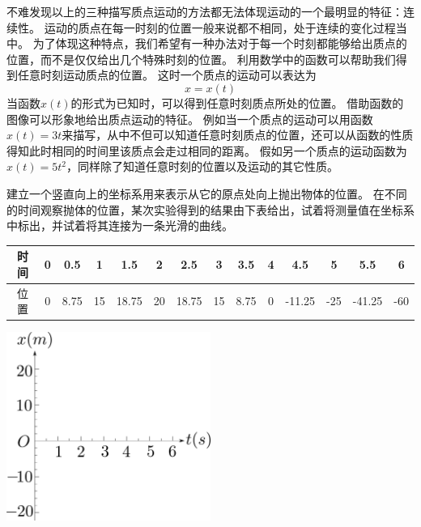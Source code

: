 不难发现以上的三种描写质点运动的方法都无法体现运动的一个最明显的特征：连续性。
运动的质点在每一时刻的位置一般来说都不相同，处于连续的变化过程当中。
为了体现这种特点，我们希望有一种办法对于每一个时刻都能够给出质点的位置，而不是仅仅给出几个特殊时刻的位置。
利用数学中的{\heiti 函数}可以帮助我们得到任意时刻运动质点的位置。
这时一个质点的运动可以表达为
\begin{equation}
x = x(t)
\end{equation}
当函数$x(t)$的形式为已知时，可以得到任意时刻质点所处的位置。
借助函数的图像可以形象地给出质点运动的特征。
例如当一个质点的运动可以用函数$x(t) = 3t$来描写，从中不但可以知道任意时刻质点的位置，还可以从函数的性质得知此时相同的时间里该质点会走过相同的距离。
假如另一个质点的运动函数为$x(t)=5t^2$，同样除了知道任意时刻的位置以及运动的其它性质。



\begin{example}
建立一个竖直向上的坐标系用来表示从它的原点处向上抛出物体的位置。
在不同的时间观察抛体的位置，某次实验得到的结果由下表给出，试着将测量值在坐标系中标出，并试着将其连接为一条光滑的曲线。

\begin{tabular}{|c|ccccccccccccc|}
\hline 
时间 & 0 & 0.5 & 1 & 1.5 & 2 & 2.5 & 3 & 3.5 & 4 & 4.5 & 5 & 5.5 & 6  \\ 
\hline 
位置 & 0 & 8.75 & 15 & 18.75 & 20 & 18.75 & 15 & 8.75 & 0 & -11.25 & -25 & -41.25 & -60 \\ 
\hline 
\end{tabular} 
\begin{center}
\includegraphics[width=0.5\textwidth]{images/motion-problem-empty-coordinate.pdf} 
\end{center}

\end{example}



